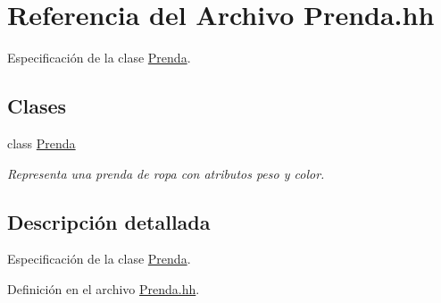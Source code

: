 \hypertarget{_prenda_8hh}{\section{Referencia del Archivo Prenda.\-hh}
\label{_prenda_8hh}
}


Especificación de la clase \hyperlink{class_prenda}{Prenda}.  


\subsection*{Clases}
\begin{DoxyCompactItemize}
\item 
class \hyperlink{class_prenda}{Prenda}
\begin{DoxyCompactList}\small\item\em Representa una prenda de ropa con atributos peso y color. \end{DoxyCompactList}\end{DoxyCompactItemize}


\subsection{Descripción detallada}
Especificación de la clase \hyperlink{class_prenda}{Prenda}. 

Definición en el archivo \hyperlink{_prenda_8hh_source}{Prenda.\-hh}.

